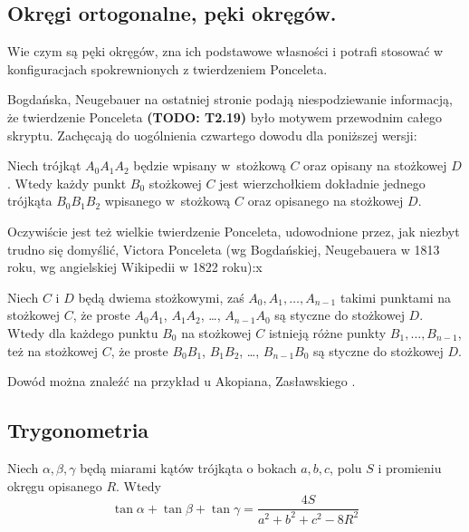 \subsection{Okręgi ortogonalne, pęki okręgów.}
Wie czym są pęki okręgów, zna ich podstawowe własności i potrafi stosować w konfiguracjach spokrewnionych z twierdzeniem Ponceleta.   


Bogdańska, Neugebauer \cite[s. 267]{neugebauer_2018} na ostatniej stronie podają niespodziewanie informacją, że twierdzenie Ponceleta {\color{red}\textbf{(TODO: T2.19)}\color{black}} było motywem przewodnim całego skryptu.
Zachęcają do uogólnienia czwartego dowodu dla poniższej wersji:

\begin{theorem}
	Niech trójkąt $A_0 A_1 A_2$ będzie wpisany w~stożkową $C$ oraz opisany na stożkowej $D$.
	Wtedy każdy punkt $B_0$ stożkowej $C$ jest wierzchołkiem dokładnie jednego trójkąta $B_0 B_1 B_2$ wpisanego w~stożkową $C$ oraz opisanego na stożkowej $D$.
\end{theorem}

Oczywiście jest też wielkie twierdzenie Ponceleta, udowodnione przez, jak niezbyt trudno się domyślić, Victora Ponceleta \cite[s. 311-317]{poncelet_1865} (wg Bogdańskiej, Neugebauera w 1813 roku, wg angielskiej Wikipedii w 1822 roku):x

\begin{theorem}
	Niech $C$ i $D$ będą dwiema stożkowymi, zaś $A_0, A_1, \ldots, A_{n-1}$ takimi punktami na stożkowej $C$, że proste $A_0A_1$, $A_1A_2$, \ldots, $A_{n-1}A_0$ są styczne do stożkowej $D$.
	Wtedy dla każdego punktu $B_0$ na stożkowej $C$ istnieją różne punkty $B_1, \ldots, B_{n-1}$, też na stożkowej $C$, że proste $B_0B_1$, $B_1B_2$, \ldots, $B_{n-1}B_0$ są styczne do stożkowej $D$.
\end{theorem}

Dowód można znaleźć na przykład u Akopiana, Zasławskiego \cite[s. 93, 61, 67, 115, 124]{akopyan_2007}.


\subsection{Trygonometria}

\begin{proposition}
	Niech $\alpha, \beta, \gamma$ będą miarami kątów trójkąta o bokach $a, b, c$, polu $S$ i promieniu okręgu opisanego $R$.
	Wtedy
	\begin{equation}
		\tan \alpha + \tan \beta + \tan \gamma = \frac{4S}{a^2 + b^2 + c^2 - 8R^2}
	\end{equation}
\end{proposition}


